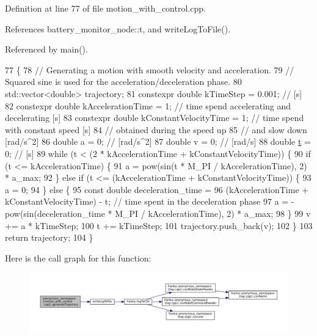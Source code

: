 Definition at line 77 of file motion\+\_\+with\+\_\+control.\+cpp.



References battery\+\_\+monitor\+\_\+node\+::t, and write\+Log\+To\+File().



Referenced by main().


\begin{DoxyCode}
77                                                    \{
78   \textcolor{comment}{// Generating a motion with smooth velocity and acceleration.}
79   \textcolor{comment}{// Squared sine is used for the acceleration/deceleration phase.}
80   std::vector<double> trajectory;
81   constexpr \textcolor{keywordtype}{double} kTimeStep = 0.001;          \textcolor{comment}{// [s]}
82   constexpr \textcolor{keywordtype}{double} kAccelerationTime = 1;      \textcolor{comment}{// time spend accelerating and decelerating [s]}
83   constexpr \textcolor{keywordtype}{double} kConstantVelocityTime = 1;  \textcolor{comment}{// time spend with constant speed [s]}
84   \textcolor{comment}{// obtained during the speed up}
85   \textcolor{comment}{// and slow down [rad/s^2]}
86   \textcolor{keywordtype}{double} a = 0;  \textcolor{comment}{// [rad/s^2]}
87   \textcolor{keywordtype}{double} v = 0;  \textcolor{comment}{// [rad/s]}
88   \textcolor{keywordtype}{double} \hyperlink{namespacebattery__monitor__node_a7a63d20d1ea461e280f4eb5b47f925cd}{t} = 0;  \textcolor{comment}{// [s]}
89   \textcolor{keywordflow}{while} (t < (2 * kAccelerationTime + kConstantVelocityTime)) \{
90     \textcolor{keywordflow}{if} (t <= kAccelerationTime) \{
91       a = pow(sin(t * M\_PI / kAccelerationTime), 2) * a\_max;
92     \} \textcolor{keywordflow}{else} \textcolor{keywordflow}{if} (t <= (kAccelerationTime + kConstantVelocityTime)) \{
93       a = 0;
94     \} \textcolor{keywordflow}{else} \{
95       \textcolor{keyword}{const} \textcolor{keywordtype}{double} deceleration\_time =
96           (kAccelerationTime + kConstantVelocityTime) - t;  \textcolor{comment}{// time spent in the deceleration phase}
97       a = -pow(sin(deceleration\_time * M\_PI / kAccelerationTime), 2) * a\_max;
98     \}
99     v += a * kTimeStep;
100     t += kTimeStep;
101     trajectory.push\_back(v);
102   \}
103   \textcolor{keywordflow}{return} trajectory;
104 \}
\end{DoxyCode}
Here is the call graph for this function\+:
\nopagebreak
\begin{figure}[H]
\begin{center}
\leavevmode
\includegraphics[width=350pt]{namespaceanonymous__namespace_02motion__with__control_8cpp_03_a96cf55e603f54e4305aaff129fc95d0a_cgraph}
\end{center}
\end{figure}
